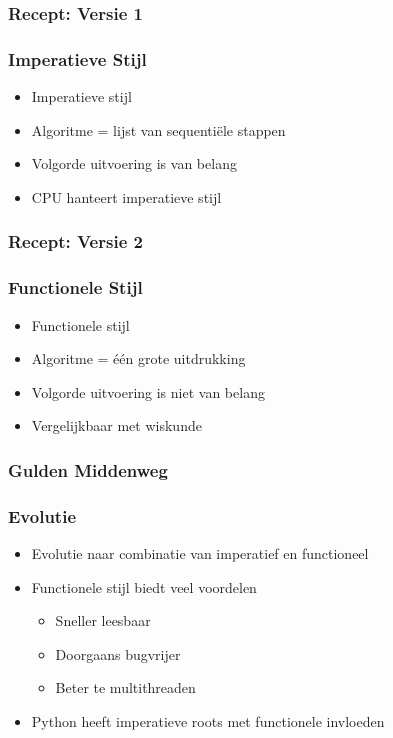 \begin{frame}
  \frametitle{Recept: Versie 1}
  \begin{overprint}
  \end{overprint}
\end{frame}

\begin{frame}
  \frametitle{Imperatieve Stijl}
  \begin{itemize}
    \item Imperatieve stijl
    \item Algoritme = lijst van sequenti\"ele stappen
    \item Volgorde uitvoering is van belang
    \item CPU hanteert imperatieve stijl
  \end{itemize}
\end{frame}

\begin{frame}
  \frametitle{Recept: Versie 2}
\end{frame}

\begin{frame}
  \frametitle{Functionele Stijl}
  \begin{itemize}
    \item Functionele stijl
    \item Algoritme = \'e\'en grote uitdrukking
    \item Volgorde uitvoering is niet van belang
    \item Vergelijkbaar met wiskunde
  \end{itemize}
\end{frame}

\begin{frame}
  \frametitle{Gulden Middenweg}
\end{frame}

\begin{frame}
  \frametitle{Evolutie}
  \begin{itemize}
    \item Evolutie naar combinatie van imperatief en functioneel
    \item Functionele stijl biedt veel voordelen
          \begin{itemize}
            \item Sneller leesbaar
            \item Doorgaans bugvrijer
            \item Beter te multithreaden
          \end{itemize}
    \item Python heeft imperatieve roots met functionele invloeden
  \end{itemize}
\end{frame}

